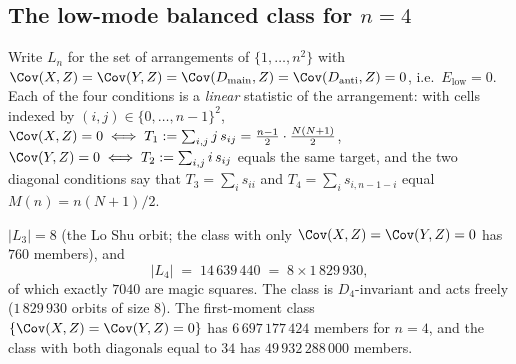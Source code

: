 
\subsection{The low-mode balanced class for $n=4$}
\label{sec:lowmode_n4}

Write $L_n$ for the set of arrangements of $\{1,\dots,n^2\}$ with
$\Cov(X,Z)=\Cov(Y,Z)=\Cov(D_{\mathrm{main}},Z)=\Cov(D_{\mathrm{anti}},Z)=0$,
i.e.\ $E_{\mathrm{low}}=0$.  Each of the four conditions is a \emph{linear} statistic of the
arrangement: with cells indexed by $(i,j)\in\{0,\dots,n-1\}^2$,
$\Cov(X,Z)=0 \iff T_1:=\sum_{i,j} j\,s_{ij} = \tfrac{n-1}{2}\cdot\tfrac{N(N+1)}{2}$,
$\Cov(Y,Z)=0 \iff T_2:=\sum_{i,j} i\,s_{ij}$ equals the same target, and the two diagonal
conditions say that $T_3=\sum_i s_{ii}$ and $T_4=\sum_i s_{i,n-1-i}$ equal $M(n)=n(N+1)/2$.

\begin{proposition}
\label{prop:L4}
$|L_3| = 8$ (the Lo Shu orbit; the class with only $\Cov(X,Z)=\Cov(Y,Z)=0$ has $760$ members), and
\[
  |L_4| \;=\; 14\,639\,440 \;=\; 8\times 1\,829\,930 ,
\]
of which exactly $7040$ are magic squares.  The class is $D_4$-invariant and acts freely
($1\,829\,930$ orbits of size $8$).  The first-moment class
$\{\Cov(X,Z)=\Cov(Y,Z)=0\}$ has $6\,697\,177\,424$ members for $n=4$,
and the class with both diagonals equal to $34$ has $49\,932\,288\,000$ members.
\end{proposition}


